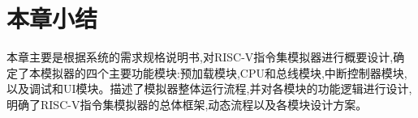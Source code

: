 \section{本章小结}
本章主要是根据系统的需求规格说明书,对RISC-V指令集模拟器进行概要设计,确定了本模拟器的四个主要功能模块:预加载模块,CPU和总线模块,中断控制器模块,以及调试和UI模块。描述了模拟器整体运行流程,并对各模块的功能逻辑进行设计,明确了RISC-V指令集模拟器的总体框架,动态流程以及各模块设计方案。